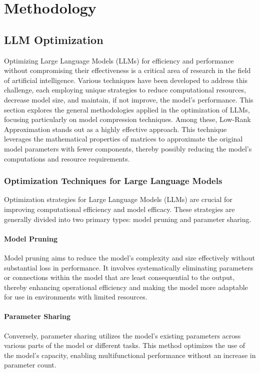 \chapter{Methodology}

\section{LLM Optimization}
    Optimizing Large Language Models (LLMs) for efficiency and performance without compromising their effectiveness is a critical area of research in the field of artificial intelligence. Various techniques have been developed to address this challenge, each employing unique strategies to reduce computational resources, decrease model size, and maintain, if not improve, the model's performance. This section explores the general methodologies applied in the optimization of LLMs, focusing particularly on model compression techniques. Among these, Low-Rank Approximation stands out as a highly effective approach. This technique leverages the mathematical properties of matrices to approximate the original model parameters with fewer components, thereby possibly reducing the model's computations and resource requirements.

    \subsection{Optimization Techniques for Large Language Models}
        Optimization strategies for Large Language Models (LLMs) are crucial for improving computational efficiency and model efficacy. These strategies are generally divided into two primary types: model pruning and parameter sharing.

        \subsubsection{Model Pruning}
        Model pruning aims to reduce the model's complexity and size effectively without substantial loss in performance. It involves systematically eliminating parameters or connections within the model that are least consequential to the output, thereby enhancing operational efficiency and making the model more adaptable for use in environments with limited resources.

        \subsubsection{Parameter Sharing}
        Conversely, parameter sharing utilizes the model's existing parameters across various parts of the model or different tasks. This method optimizes the use of the model’s capacity, enabling multifunctional performance without an increase in parameter count.

